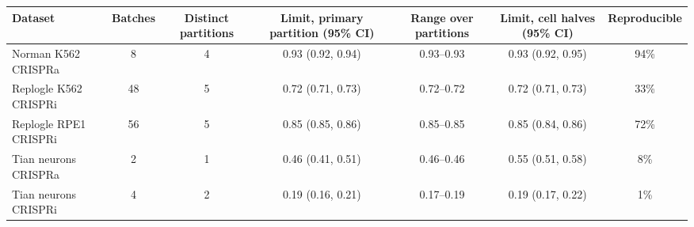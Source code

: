 \begin{tabular}{lcccccc}
\toprule
Dataset & Batches & Distinct partitions & Limit, primary partition (95\% CI) & Range over partitions & Limit, cell halves (95\% CI) & Reproducible \\
\midrule
Norman K562 CRISPRa & 8 & 4 & 0.93 (0.92, 0.94) & 0.93--0.93 & 0.93 (0.92, 0.95) & 94\% \\
Replogle K562 CRISPRi & 48 & 5 & 0.72 (0.71, 0.73) & 0.72--0.72 & 0.72 (0.71, 0.73) & 33\% \\
Replogle RPE1 CRISPRi & 56 & 5 & 0.85 (0.85, 0.86) & 0.85--0.85 & 0.85 (0.84, 0.86) & 72\% \\
Tian neurons CRISPRa & 2 & 1 & 0.46 (0.41, 0.51) & 0.46--0.46 & 0.55 (0.51, 0.58) & 8\% \\
Tian neurons CRISPRi & 4 & 2 & 0.19 (0.16, 0.21) & 0.17--0.19 & 0.19 (0.17, 0.22) & 1\% \\
\bottomrule
\end{tabular}